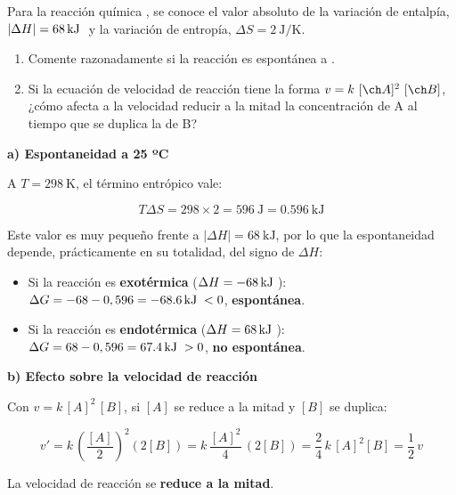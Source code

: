 \begin{exerciseEVAU}
    Para la reacción química , se conoce el valor absoluto de la variación de entalpía, \(|\Delta H| = \energia[kj]{68}\) y la variación de entropía, \(\Delta S = \SI{2}{\joule\per\kelvin}\).
    \begin{enumerate}[label=\letraminuscula]
\item Comente razonadamente si la reacción es espontánea a .
\item Si la ecuación de velocidad de reacción tiene la forma \(v = k\ \conc{A}^2\ \conc{B}\), ¿cómo afecta a la velocidad reducir a la mitad la concentración de A al tiempo que se duplica la de B?
    \end{enumerate}

    \begin{solu}

        \textbf{a) Espontaneidad a 25 ºC}

        A \(T = \SI{298}{\kelvin}\), el término entrópico vale:

        \begin{equation*}
            T \Delta S = 298 \times 2 = \SI{596}{\joule} = \SI{0.596}{\kilo\joule}
        \end{equation*}

        Este valor es muy pequeño frente a \(|\Delta H| = \SI{68}{\kilo\joule}\), por lo que la espontaneidad depende, prácticamente en su totalidad, del signo de \(\Delta H\):

        \begin{itemize}
            \item Si la reacción es \textbf{exotérmica} (\(\Delta H = \energia[kj]{-68}\)): \(\Delta G = -68 - 0,596 = \energia[kj]{-68.6} < 0\), \textbf{espontánea}.
            \item Si la reacción es \textbf{endotérmica} (\(\Delta H = \energia[kj]{68}\)): \(\Delta G = 68 - 0,596 = \energia[kj]{67.4} > 0\), \textbf{no espontánea}.
        \end{itemize}

        \textbf{b) Efecto sobre la velocidad de reacción}

        Con \(v = k\, [A]^2\, [B]\), si \([A]\) se reduce a la mitad y \([B]\) se duplica:

        \begin{equation*}
            v' = k\, \left( \dfrac{[A]}{2} \right)^2 (2[B]) = k\, \dfrac{[A]^2}{4}\, (2[B]) = \dfrac{2}{4}\, k\, [A]^2 [B] = \dfrac{1}{2}\, v
        \end{equation*}

        La velocidad de reacción se \textbf{reduce a la mitad}.

    \end{solu}

\end{exerciseEVAU}

